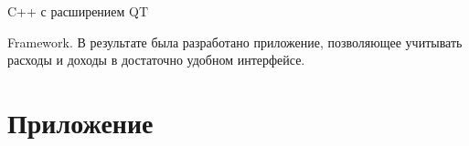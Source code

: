 \documentclass[a4paper,12pt]{article}
\begin{document}
C++ с расширением QT

Framework. В результате была разработано приложение, позволяющее учитывать расходы и доходы в достаточно удобном интерфейсе.

\pagebreak
\nocite{qtdoc}
\nocite{qt532015}
\nocite{Warren2007}
\nocite{AzureDevops}
\printbibliography

\pagebreak
\section*{\centering Приложение}
\end{document}
